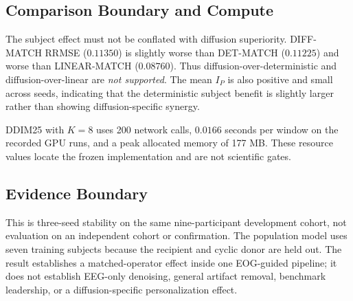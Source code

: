 \subsection{Comparison Boundary and Compute}
The subject effect must not be conflated with diffusion superiority.
DIFF-MATCH RRMSE ($0.11350$) is slightly worse than DET-MATCH ($0.11225$) and
worse than LINEAR-MATCH ($0.08760$). Thus diffusion-over-deterministic and
diffusion-over-linear are \emph{not supported}. The mean $I_P$ is also positive
and small across seeds, indicating that the deterministic subject benefit is
slightly larger rather than showing diffusion-specific synergy.

DDIM25 with $K=8$ uses 200 network calls, $0.0166$ seconds per window on the
recorded GPU runs, and a peak allocated memory of 177 MB. These resource values
locate the frozen implementation and are not scientific gates.

\subsection{Evidence Boundary}
This is three-seed stability on the same nine-participant development cohort,
not evaluation on an independent cohort or confirmation. The population model
uses seven training subjects because the recipient and cyclic donor are held
out. The result establishes a matched-operator effect inside one EOG-guided
pipeline; it does not establish EEG-only denoising, general artifact removal,
benchmark leadership, or a diffusion-specific personalization effect.
